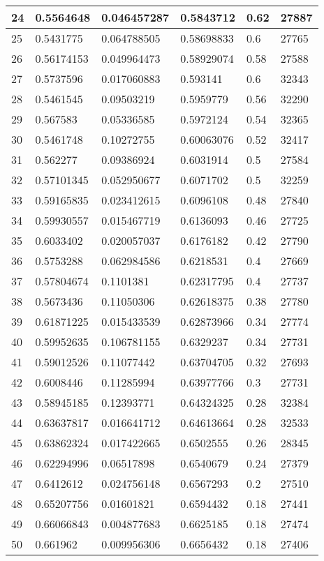 \begin{longtable}{|l|l|l|l|l|l|}
24 & 0.5564648 & 0.046457287 & 0.5843712 & 0.62 & 27887 \\ \hline 
25 & 0.5431775 & 0.064788505 & 0.58698833 & 0.6 & 27765 \\ \hline 
26 & 0.56174153 & 0.049964473 & 0.58929074 & 0.58 & 27588 \\ \hline 
27 & 0.5737596 & 0.017060883 & 0.593141 & 0.6 & 32343 \\ \hline 
28 & 0.5461545 & 0.09503219 & 0.5959779 & 0.56 & 32290 \\ \hline 
29 & 0.567583 & 0.05336585 & 0.5972124 & 0.54 & 32365 \\ \hline 
30 & 0.5461748 & 0.10272755 & 0.60063076 & 0.52 & 32417 \\ \hline 
31 & 0.562277 & 0.09386924 & 0.6031914 & 0.5 & 27584 \\ \hline 
32 & 0.57101345 & 0.052950677 & 0.6071702 & 0.5 & 32259 \\ \hline 
33 & 0.59165835 & 0.023412615 & 0.6096108 & 0.48 & 27840 \\ \hline 
34 & 0.59930557 & 0.015467719 & 0.6136093 & 0.46 & 27725 \\ \hline 
35 & 0.6033402 & 0.020057037 & 0.6176182 & 0.42 & 27790 \\ \hline 
36 & 0.5753288 & 0.062984586 & 0.6218531 & 0.4 & 27669 \\ \hline 
37 & 0.57804674 & 0.1101381 & 0.62317795 & 0.4 & 27737 \\ \hline 
38 & 0.5673436 & 0.11050306 & 0.62618375 & 0.38 & 27780 \\ \hline 
39 & 0.61871225 & 0.015433539 & 0.62873966 & 0.34 & 27774 \\ \hline 
40 & 0.59952635 & 0.106781155 & 0.6329237 & 0.34 & 27731 \\ \hline 
41 & 0.59012526 & 0.11077442 & 0.63704705 & 0.32 & 27693 \\ \hline 
42 & 0.6008446 & 0.11285994 & 0.63977766 & 0.3 & 27731 \\ \hline 
43 & 0.58945185 & 0.12393771 & 0.64324325 & 0.28 & 32384 \\ \hline 
44 & 0.63637817 & 0.016641712 & 0.64613664 & 0.28 & 32533 \\ \hline 
45 & 0.63862324 & 0.017422665 & 0.6502555 & 0.26 & 28345 \\ \hline 
46 & 0.62294996 & 0.06517898 & 0.6540679 & 0.24 & 27379 \\ \hline 
47 & 0.6412612 & 0.024756148 & 0.6567293 & 0.2 & 27510 \\ \hline 
48 & 0.65207756 & 0.01601821 & 0.6594432 & 0.18 & 27441 \\ \hline 
49 & 0.66066843 & 0.004877683 & 0.6625185 & 0.18 & 27474 \\ \hline 
50 & 0.661962 & 0.009956306 & 0.6656432 & 0.18 & 27406 \\ \hline 
\end{longtable}